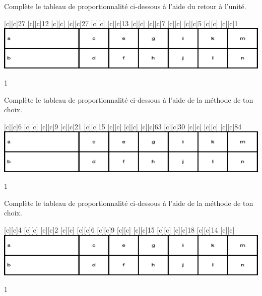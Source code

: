 \documentclass[a4paper,11pt]{report}
\begin{document}
\begin{exop}{
Complète le tableau de proportionnalité ci-dessous à l'aide du retour à l'unité.
\begin{center}
[c][c]{27}
[c][c]{12}
[c][c]{}
[c][c]{27}
[c][c]{}
[c][c]{13}
[c][c]{}
[c][c]{7}
[c][c]{}
[c][c]{5}
[c][c]{}
[c][c]{{\color{blue}1}}
\includegraphics[scale=.9]{media/fa-30/tableaut.eps}
\end{center}
\vspace{-0.5cm}}{1}
\end{exop}

\newpage
\begin{exop}{
Complète le tableau de proportionnalité ci-dessous à l'aide de la méthode de ton choix.
\begin{center}
[c][c]{6}
[c][c]{}
[c][c]{9}
[c][c]{21}
[c][c]{15}
[c][c]{}
[c][c]{}
[c][c]{63}
[c][c]{30}
[c][c]{}
[c][c]{}
[c][c]{84}
\includegraphics[scale=.9]{media/fa-30/tableaut.eps}
\end{center}
\vspace{-0.5cm}}{1}
\end{exop}

\begin{exop}{
Complète le tableau de proportionnalité ci-dessous à l'aide de la méthode de ton choix.
\begin{center}
[c][c]{4}
[c][c]{}
[c][c]{2}
[c][c]{}
[c][c]{6}
[c][c]{9}
[c][c]{}
[c][c]{15}
[c][c]{}
[c][c]{18}
[c][c]{14}
[c][c]{}
\includegraphics[scale=.9]{media/fa-30/tableaut.eps}
\end{center}
\vspace{-0.5cm}}{1}
\end{exop}
\end{document}
